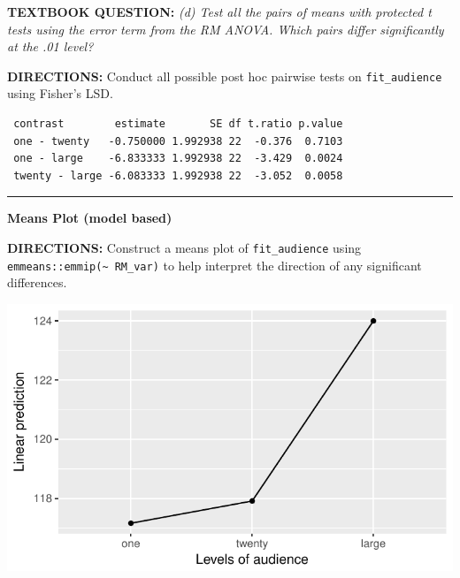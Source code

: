 \documentclass[]{article}
\newenvironment{Shaded}{\begin{snugshade}}{\end{snugshade}}
\newcommand{\KeywordTok}[1]{\textcolor[rgb]{0.13,0.29,0.53}{\textbf{#1}}}
\newcommand{\DataTypeTok}[1]{\textcolor[rgb]{0.13,0.29,0.53}{#1}}
\newcommand{\StringTok}[1]{\textcolor[rgb]{0.31,0.60,0.02}{#1}}
\newcommand{\CommentTok}[1]{\textcolor[rgb]{0.56,0.35,0.01}{\textit{#1}}}
\newcommand{\OperatorTok}[1]{\textcolor[rgb]{0.81,0.36,0.00}{\textbf{#1}}}
\newcommand{\NormalTok}[1]{#1}
\begin{document}
\textbf{TEXTBOOK QUESTION:} \emph{(d) Test all the pairs of means with
protected t tests using the error term from the RM ANOVA. Which pairs
differ significantly at the .01 level?}

\textbf{DIRECTIONS:} Conduct all possible post hoc pairwise tests on
\texttt{fit\_audience} using Fisher's LSD.

\begin{Shaded}
\end{Shaded}

\begin{verbatim}
 contrast        estimate       SE df t.ratio p.value
 one - twenty   -0.750000 1.992938 22  -0.376  0.7103
 one - large    -6.833333 1.992938 22  -3.429  0.0024
 twenty - large -6.083333 1.992938 22  -3.052  0.0058
\end{verbatim}

\begin{center}\rule{0.5\linewidth}{\linethickness}\end{center}

\textbf{Means Plot (model based)}

\textbf{DIRECTIONS:} Construct a means plot of \texttt{fit\_audience}
using \texttt{emmeans::emmip(\textasciitilde{}\ RM\_var)} to help
interpret the direction of any significant differences.

\begin{Shaded}
\end{Shaded}

\begin{center}\includegraphics{Unit_5_assignment_KEY_R__spr18__files/figure-latex/unnamed-chunk-9-1} \end{center}
\end{document}
